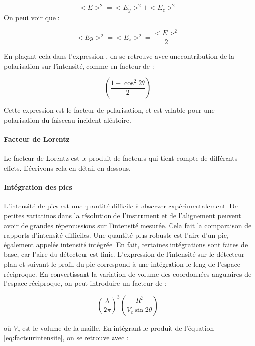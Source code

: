 \begin{equation}
    <E>^2 = <E_y>^2 + <E_z>^2
\end{equation}
On peut voir que :

\begin{equation}
    <Ey>^2 = <E_z>^2 = \frac{<E>^2}{2}
\end{equation}

En plaçant cela dans l'expression \label{eq:champincid}, on se retrouve avec unecontribution de la polarisation sur l'intensité, comme un facteur de :

\begin{equation}
    \left( \frac{1+\cos^2 2\theta}{2} \right)
\end{equation}

Cette expression est le facteur de polarisation, et est valable pour une polarisation du faisceau incident aléatoire.

\paragraph{Facteur de Lorentz}

Le facteur de Lorentz est le produit de facteurs qui tient compte de différents effets. Décrivons cela en détail en dessous.

\paragraph{Intégration des pics}

L'intensité de pics est une quantité difficile à observer expérimentalement. De petites variatinos dans la résolution de l'instrument et de l'alignement peuvent avoir de grandes répercussions sur l'intensité mesurée. Cela fait la comparaison de rapports d'intensité difficiles. Une quantité plus robuste est l'aire d'un pic, également appelée intensité intégrée. En fait, certaines intégrations sont faites de base, car l'aire du détecteur est finie. L'expression de l'intensité sur le détecteur plan et suivant le profil du pic correspond à une intégration le long de l'espace réciproque. En convertissant la variation de volume des coordonnées angulaires de l'espace réciproque, on peut introduire un facteur de :

\begin{equation}
    \left(\frac{\lambda}{2\pi} \right)^3 \left( \frac{R^2}{V_c \sin 2\theta} \right)
    \label{eq:integ1}
\end{equation}

où $V_c$ est le volume de la maille. En intégrant le produit de l'équation \ref{eq:facteurintensite}, on se retrouve avec :

